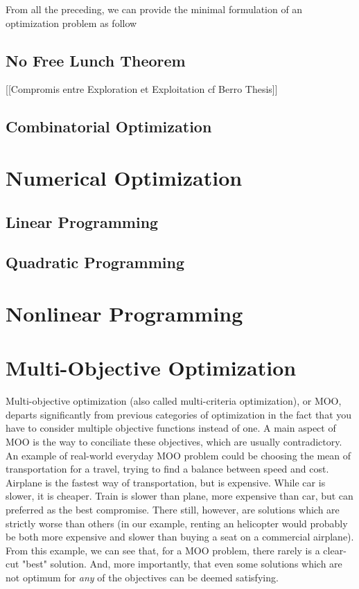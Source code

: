 From all the preceding, we can provide the minimal formulation of an optimization problem as follow 


\subsection{No Free Lunch Theorem}
[[Compromis entre Exploration et Exploitation cf Berro Thesis]]

\subsection{Combinatorial Optimization}

\section{Numerical Optimization}
\subsection{Linear Programming}
\subsection{Quadratic Programming}
\section{Nonlinear Programming}

\section{Multi-Objective Optimization}

Multi-objective optimization (also called multi-criteria optimization), or MOO, departs significantly from previous categories of optimization in the fact that you have to consider multiple objective functions instead of one. A main aspect of MOO is the way to conciliate these objectives, which are usually contradictory.
An example of real-world everyday MOO problem could be choosing the mean of transportation for a travel, trying to find a balance between speed and cost. Airplane is the fastest way of transportation, but is expensive. While car is slower, it is cheaper. Train is slower than plane, more expensive than car, but can preferred as the best compromise. There still, however, are solutions which are strictly worse than others (in our example, renting an helicopter would probably be both more expensive and slower than buying a seat on a commercial airplane).
From this example, we can see that, for a MOO problem, there rarely is a clear-cut "best" solution. And, more importantly, that even some solutions which are not optimum for \emph{any} of the objectives can be deemed satisfying. 

